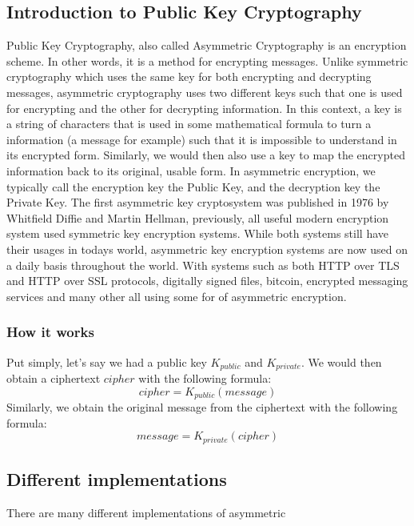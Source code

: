 \documentclass[conference]{IEEEtran}
\begin{document}
\subsection{Introduction to Public Key Cryptography}
Public Key Cryptography, also called Asymmetric Cryptography is an 
encryption scheme. In other words, it is a method for encrypting messages.
Unlike symmetric cryptography which uses the same key for both encrypting and decrypting
messages, asymmetric cryptography uses two different keys such that one 
is used for encrypting and the other for decrypting information.
In this context, a key is a string of characters that is used in some mathematical
formula to turn a information (a message for example) such that it is impossible to understand in its encrypted form. 
Similarly, we would then also use a key to map the encrypted information back to its original, usable form.
In asymmetric encryption, we typically call the encryption key
the Public Key, and the decryption key the Private Key.
The first asymmetric key cryptosystem was published in 1976 by Whitfield Diffie and Martin Hellman, previously,
all useful modern encryption system used symmetric key encryption systems. 
While both systems still have their usages in todays world,
asymmetric key encryption systems are now used on a daily basis throughout the world. With 
systems such as both HTTP over TLS and HTTP over SSL protocols, digitally signed files, bitcoin,
encrypted messaging services and many other all using some for of asymmetric encryption. 

\subsubsection{How it works}
Put simply, let's say we had a public key $K_{public}$ and $K_{private}$.
We would then obtain a ciphertext $cipher$ with the following formula: 
\begin{equation*}
    cipher = K_{public}(message)
\end{equation*}
Similarly, we obtain the original message from the ciphertext with the following formula:
\begin{equation*}
    message = K_{private}(cipher)
\end{equation*}

\subsection{Different implementations}
There are many different implementations of asymmetric 
\end{document}
